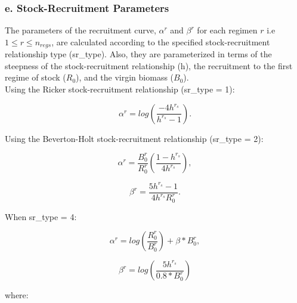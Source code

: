 \documentclass{article}
\begin{document}
\hfill

\subsubsection{e. Stock-Recruitment Parameters}

The parameters of the recruitment curve, $\alpha^r$ and $\beta^r$ for each regimen $r$ i.e $1\leq r \leq n_{regs}$,  are calculated according to the specified stock-recruitment relationship type (sr\_type). Also, they are parameterized in terms of the steepness of the stock-recruitment relationship (h), the recruitment to the first regime of stock ($R_0$), and the virgin biomass ($B_0$).\\

Using the Ricker stock-recruitment relationship (sr\_type = 1):

\begin{equation}
\alpha^r = log\left(\dfrac{-4h^{r_s}}{h^{r_s}-1}\right).
\end{equation}

Using the Beverton-Holt stock-recruitment relationship (sr\_type = 2):

\begin{equation}
\alpha^r = \dfrac{B^{r}_0}{R^{r}_0}\left(\dfrac{1 - h^{r_s}}{4h^{r_s}}\right),  
\end{equation}

\begin{equation}
\beta^r = \dfrac{5h^{r_s}-1}{4h^{r_s}R^{r}_0}.
\end{equation}

When sr\_type = 4:

\begin{equation}
\alpha^r = log\left(\dfrac{R^{r}_0}{B^{r}_0}\right)+\beta*B^{r}_0, 
\end{equation}

\begin{equation}
\beta^r = log\left(\dfrac{5h^{r_s}}{0.8*B^{r}_0}\right)
\end{equation}

where:
\end{document}
